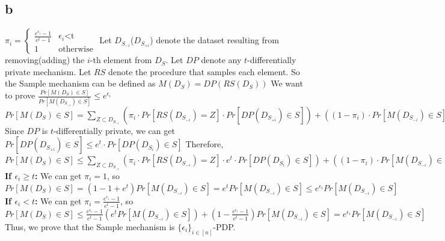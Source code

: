 \documentclass[12pt]{article}
\begin{document}
\subsection{b}
$\pi_i=\begin{cases}\frac{e^{\epsilon_i}-1}{e^t-1}& \text{$\epsilon_i$<t}\\ 1 & \text{otherwise} \end{cases}$
\newline
Let $D_{S_{-i}}$($D_{S_{+i}}$) denote the dataset resulting from removing(adding) the $i$-th element from $D_S$.
\newline
Let $DP$ denote any $t$-differentially private mechanism. 
\newline
Let $RS$ denote the procedure that samples each element. 
\newline
So the Sample mechanism can be defined as $M(D_S)=DP(RS(D_S))$
\newline
We want to prove $\frac{Pr[M(D_S)\in S]}{Pr[M(D_{S_{-i}})\in S]}\leq e^{\epsilon_i}$
\newline
$Pr[M(D_S)\in S]=\sum\limits_{Z\subset D_{S_{-i}}}(\pi_i\cdot Pr[RS(D_{S_{-i}})=Z]\cdot Pr[DP(D_{S_{+i}})\in S])+((1-\pi_i)\cdot Pr[M(D_{S_{-i}})\in S])$
\newline
Since $DP$ is $t$-differentially private, we can get $Pr[DP(D_{S_{+i}})\in S]\leq e^t\cdot Pr[DP(D_{S_i})\in S]$
\newline
Therefore, $Pr[M(D_S)\in S]\leq \sum\limits_{Z\subset D_{S_{-i}}}(\pi_i\cdot Pr[RS(D_{S_{-i}})=Z]\cdot e^t\cdot Pr[DP(D_{S_i})\in S])+((1-\pi_i)\cdot Pr[M(D_{S_{-i}})\in S])=\pi_i(e^t\cdot Pr[M(D_{S_{-i}})\in S])+(1-\pi_i)Pr[M(D_{S_{-i}})\in S]=(1-\pi_i+\pi_ie^t)Pr[M(D_{S_{-i}})\in S]$
\newline
\textbf{If $\epsilon_i\geq t$:}
\newline
We can get $\pi_i=1$, so $Pr[M(D_S)\in S]=(1-1+e^t)Pr[M(D_{S_{-i}})\in S]=e^tPr[M(D_{S_{-i}})\in S]\leq e^{\epsilon_i}Pr[M(D_{S_{-i}})\in S]$
\newline
\textbf{If $\epsilon_i<t$:}
\newline
We can get $\pi_i=\frac{e^{\epsilon_i}-1}{e^t-1}$, so $Pr[M(D_S)\in S]\leq \frac{e^{\epsilon_i}-1}{e^t-1}(e^tPr[M(D_{S_{-i}})\in S])+(1-\frac{e^{\epsilon_i}-1}{e^t-1})Pr[M(D_{S_{-i}})\in S]=e^{\epsilon_i}Pr[M(D_{S_{-i}})\in S]$
\newline
Thus, we prove that the Sample mechanism is $\{\epsilon_i\}_{i\in [n]}$-PDP.
\end{document}

